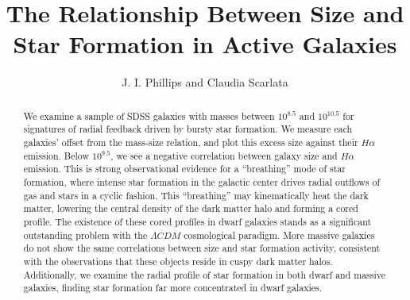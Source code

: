 \documentclass[iop]{emulateapj}
\begin{document}

\title{The Relationship Between Size and Star Formation in Active Galaxies}


\author{J. I. Phillips and Claudia Scarlata }




\begin{abstract}
We examine a sample of SDSS galaxies with masses between $10^{8.5}$ and $10^{10.5}$ for signatures of radial feedback driven by bursty star formation. We measure each galaxies' offset from the mass-size relation, and plot this excess size against their $H\alpha$ emission. Below $10^{9.5}$, we see a negative correlation between galaxy size and $H\alpha$ emission. This is strong observational evidence for a ``breathing'' mode of star formation, where intense star formation in the galactic center drives radial outflows of gas and stars in a cyclic fashion. This ``breathing'' may kinematically heat the dark matter, lowering the central density of the dark matter halo and forming a cored profile. The existence of these cored profiles in dwarf galaxies stands as a significant outstanding problem with the $\Lambda CDM$ cosmological paradigm. More massive galaxies do not show the same correlations between size and star formation activity, consistent with the observations that these objects reside in cuspy dark matter halos. Additionally, we examine the radial profile of star formation in both dwarf and massive galaxies, finding star formation far more concentrated in dwarf galaxies.
\end{abstract}
\end{document}
